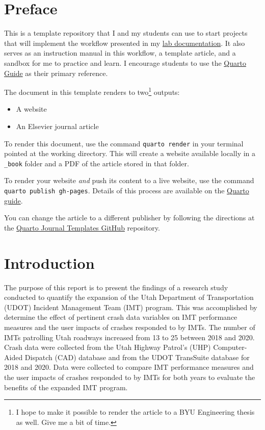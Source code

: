 \documentclass[
  letterpaper,
  authoryear]{elsarticle}
\begin{document}
\section*{Preface}\label{preface}


This is a template repository that I and my students can use to start
projects that will implement the workflow presented in my
\href{https://gregmacfarlane.github.io/lab/workflow.html}{lab
documentation}. It also serves as an instruction manual in this
workflow, a template article, and a sandbox for me to practice and
learn. I encourage students to use the
\href{https://quarto.org/docs/guide/}{Quarto Guide} as their primary
reference.

The document in this template renders to two\footnote{I hope to make it
  possible to render the article to a BYU Engineering thesis as well.
  Give me a bit of time.} outputs:

\begin{itemize}
\item
  A website
\item
  An Elsevier journal article
\end{itemize}

To render this document, use the command \texttt{quarto\ render} in your
terminal pointed at the working directory. This will create a website
available locally in a \texttt{\_book} folder and a PDF of the article
stored in that folder.

To render your website \emph{and} push its content to a live website,
use the command \texttt{quarto\ publish\ gh-pages}. Details of this
process are available on the
\href{https://quarto.org/docs/publishing/github-pages.html\#publish-command}{Quarto
guide}.

You can change the article to a different publisher by following the
directions at the \href{https://github.com/quarto-journals}{Quarto
Journal Templates GitHub} repository.


\section{Introduction}\label{introduction}

The purpose of this report is to present the findings of a research
study conducted to quantify the expansion of the Utah Department of
Transportation (UDOT) Incident Management Team (IMT) program. This was
accomplished by determine the effect of pertinent crash data variables
on IMT performance measures and the user impacts of crashes responded to
by IMTs. The number of IMTs patrolling Utah roadways increased from 13
to 25 between 2018 and 2020. Crash data were collected from the Utah
Highway Patrol's (UHP) Computer-Aided Dispatch (CAD) database and from
the UDOT TransSuite database for 2018 and 2020. Data were collected to
compare IMT performance measures and the user impacts of crashes
responded to by IMTs for both years to evaluate the benefits of the
expanded IMT program.
\end{document}
